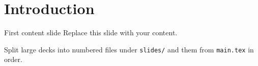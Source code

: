 \section{Introduction}

\begin{frame}{First content slide}
   Replace this slide with your content.

  \medskip
  Split large decks into numbered files under \texttt{slides/} and
  \verb|| them from \texttt{main.tex} in order.
\end{frame}
